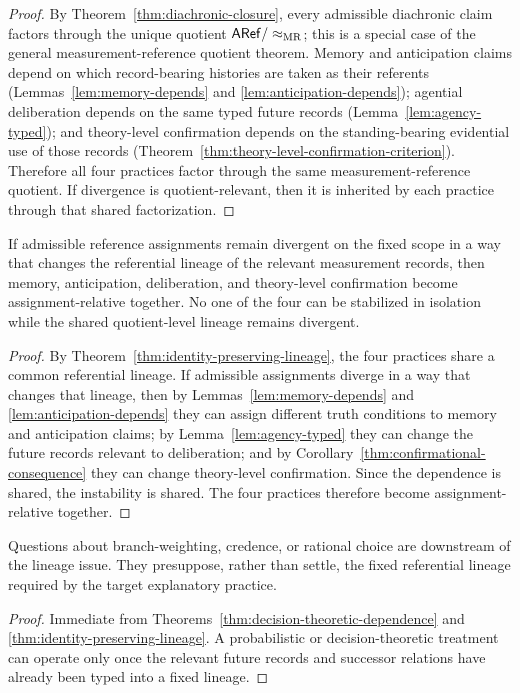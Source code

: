 \begin{proof}
By Theorem~\ref{thm:diachronic-closure}, every admissible diachronic claim factors through the unique quotient $\mathsf{ARef}/\mathrel{\approx_{\mathrm{MR}}}$; this is a special case of the general measurement-reference quotient theorem.
Memory and anticipation claims depend on which record-bearing histories are taken as their referents
(Lemmas~\ref{lem:memory-depends} and \ref{lem:anticipation-depends}); agential deliberation depends on
the same typed future records (Lemma~\ref{lem:agency-typed}); and theory-level confirmation depends on
the standing-bearing evidential use of those records (Theorem~\ref{thm:theory-level-confirmation-criterion}).
Therefore all four practices factor through the same measurement-reference quotient. If divergence is
quotient-relevant, then it is inherited by each practice through that shared factorization.
\end{proof}

\begin{theorem}
\label{thm:diachronic-practice}
If admissible reference assignments remain divergent on the fixed scope in a way that changes the
referential lineage of the relevant measurement records, then memory, anticipation, deliberation, and
theory-level confirmation become assignment-relative together. No one of the four can be stabilized in
isolation while the shared quotient-level lineage remains divergent.
\end{theorem}

\begin{proof}
By Theorem~\ref{thm:identity-preserving-lineage}, the four practices share a common referential
lineage. If admissible assignments diverge in a way that changes that lineage, then by
Lemmas~\ref{lem:memory-depends} and \ref{lem:anticipation-depends} they can assign different truth
conditions to memory and anticipation claims; by Lemma~\ref{lem:agency-typed} they can change the
future records relevant to deliberation; and by Corollary~\ref{thm:confirmational-consequence} they
can change theory-level confirmation. Since the dependence is shared, the instability is shared. The
four practices therefore become assignment-relative together.
\end{proof}

\begin{corollary}
\label{cor:structural-before-probabilistic}
Questions about branch-weighting, credence, or rational choice are downstream of the lineage issue.
They presuppose, rather than settle, the fixed referential lineage required by the target explanatory
practice.
\end{corollary}

\begin{proof}
Immediate from Theorems~\ref{thm:decision-theoretic-dependence} and
\ref{thm:identity-preserving-lineage}. A probabilistic or decision-theoretic treatment can operate only
once the relevant future records and successor relations have already been typed into a fixed lineage.
\end{proof}

